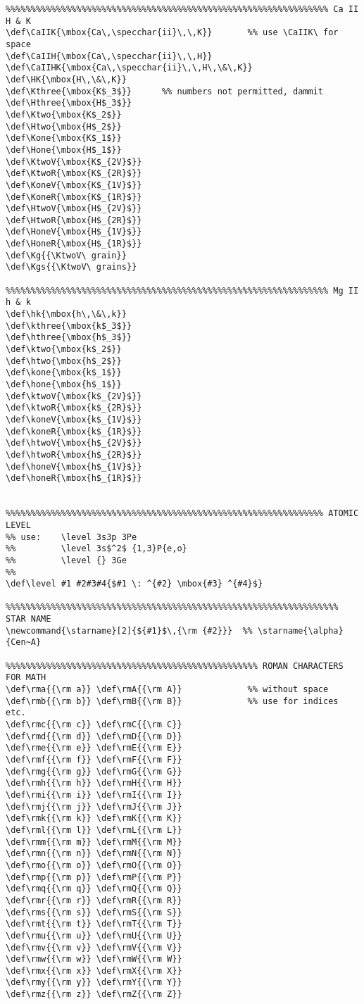 {\begin{verbatim}
%%%%%%%%%%%%%%%%%%%%%%%%%%%%%%%%%%%%%%%%%%%%%%%%%%%%%%%%%%%%%%%% Ca II H & K 
\def\CaIIK{\mbox{Ca\,\specchar{ii}\,\,K}}       %% use \CaIIK\ for space
\def\CaIIH{\mbox{Ca\,\specchar{ii}\,\,H}}
\def\CaIIHK{\mbox{Ca\,\specchar{ii}\,\,H\,\&\,K}}
\def\HK{\mbox{H\,\&\,K}}
\def\Kthree{\mbox{K$_3$}}      %% numbers not permitted, dammit
\def\Hthree{\mbox{H$_3$}}
\def\Ktwo{\mbox{K$_2$}}
\def\Htwo{\mbox{H$_2$}}
\def\Kone{\mbox{K$_1$}}     
\def\Hone{\mbox{H$_1$}}     
\def\KtwoV{\mbox{K$_{2V}$}}
\def\KtwoR{\mbox{K$_{2R}$}}
\def\KoneV{\mbox{K$_{1V}$}}
\def\KoneR{\mbox{K$_{1R}$}}
\def\HtwoV{\mbox{H$_{2V}$}}
\def\HtwoR{\mbox{H$_{2R}$}}
\def\HoneV{\mbox{H$_{1V}$}}
\def\HoneR{\mbox{H$_{1R}$}}
\def\Kg{{\KtwoV\ grain}}
\def\Kgs{{\KtwoV\ grains}}

%%%%%%%%%%%%%%%%%%%%%%%%%%%%%%%%%%%%%%%%%%%%%%%%%%%%%%%%%%%%%%%% Mg II h & k 
\def\hk{\mbox{h\,\&\,k}}
\def\kthree{\mbox{k$_3$}}    
\def\hthree{\mbox{h$_3$}}
\def\ktwo{\mbox{k$_2$}}
\def\htwo{\mbox{h$_2$}}
\def\kone{\mbox{k$_1$}}     
\def\hone{\mbox{h$_1$}}     
\def\ktwoV{\mbox{k$_{2V}$}}
\def\ktwoR{\mbox{k$_{2R}$}}
\def\koneV{\mbox{k$_{1V}$}}
\def\koneR{\mbox{k$_{1R}$}}
\def\htwoV{\mbox{h$_{2V}$}}
\def\htwoR{\mbox{h$_{2R}$}}
\def\honeV{\mbox{h$_{1V}$}}
\def\honeR{\mbox{h$_{1R}$}}


%%%%%%%%%%%%%%%%%%%%%%%%%%%%%%%%%%%%%%%%%%%%%%%%%%%%%%%%%%%%%%% ATOMIC LEVEL
%% use:    \level 3s3p 3Pe
%%         \level 3s$^2$ {1,3}P{e,o}
%%         \level {} 3Ge
%%
\def\level #1 #2#3#4{$#1 \: ^{#2} \mbox{#3} ^{#4}$}   

%%%%%%%%%%%%%%%%%%%%%%%%%%%%%%%%%%%%%%%%%%%%%%%%%%%%%%%%%%%%%%%%%% STAR NAME
\newcommand{\starname}[2]{${#1}$\,{\rm {#2}}}  %% \starname{\alpha}{Cen~A} 

%%%%%%%%%%%%%%%%%%%%%%%%%%%%%%%%%%%%%%%%%%%%%%%%%% ROMAN CHARACTERS FOR MATH 
\def\rma{{\rm a}} \def\rmA{{\rm A}}             %% without space 
\def\rmb{{\rm b}} \def\rmB{{\rm B}}             %% use for indices etc. 
\def\rmc{{\rm c}} \def\rmC{{\rm C}} 
\def\rmd{{\rm d}} \def\rmD{{\rm D}} 
\def\rme{{\rm e}} \def\rmE{{\rm E}} 
\def\rmf{{\rm f}} \def\rmF{{\rm F}} 
\def\rmg{{\rm g}} \def\rmG{{\rm G}} 
\def\rmh{{\rm h}} \def\rmH{{\rm H}} 
\def\rmi{{\rm i}} \def\rmI{{\rm I}} 
\def\rmj{{\rm j}} \def\rmJ{{\rm J}} 
\def\rmk{{\rm k}} \def\rmK{{\rm K}} 
\def\rml{{\rm l}} \def\rmL{{\rm L}} 
\def\rmm{{\rm m}} \def\rmM{{\rm M}} 
\def\rmn{{\rm n}} \def\rmN{{\rm N}} 
\def\rmo{{\rm o}} \def\rmO{{\rm O}} 
\def\rmp{{\rm p}} \def\rmP{{\rm P}} 
\def\rmq{{\rm q}} \def\rmQ{{\rm Q}} 
\def\rmr{{\rm r}} \def\rmR{{\rm R}} 
\def\rms{{\rm s}} \def\rmS{{\rm S}} 
\def\rmt{{\rm t}} \def\rmT{{\rm T}} 
\def\rmu{{\rm u}} \def\rmU{{\rm U}} 
\def\rmv{{\rm v}} \def\rmV{{\rm V}} 
\def\rmw{{\rm w}} \def\rmW{{\rm W}} 
\def\rmx{{\rm x}} \def\rmX{{\rm X}} 
\def\rmy{{\rm y}} \def\rmY{{\rm Y}} 
\def\rmz{{\rm z}} \def\rmZ{{\rm Z}} 


\end{verbatim}}
